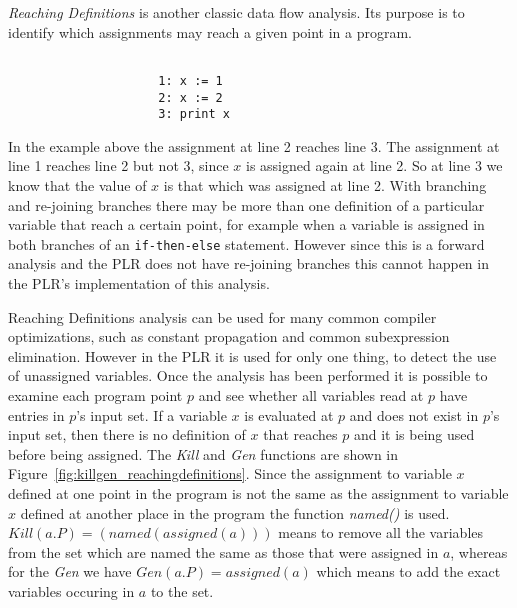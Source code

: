   \textit{Reaching Definitions} is another classic data flow analysis. Its 
  purpose is to identify which assignments may reach a given point in a 
  program.
  
\begin{Exa}
	\label{ex:reaching_definition}
	\begin{verbatim}
	
                     1: x := 1
                     2: x := 2
                     3: print x
	\end{verbatim}
\end{Exa}  
	
	In the example above the assignment at line 2 reaches line 3. The assignment 
	at line 1 reaches line 2 but not 3, since $x$ is assigned again at line 2. 
	So at line 3 we know that the value of $x$ is that which was assigned at 
	line 2. With branching and re-joining branches there may be more than one 
	definition of a particular variable that reach a certain point, for example 
	when a variable is assigned in both branches of an \texttt{if-then-else} 
	statement. However since this is a forward analysis and the PLR does not 
	have re-joining branches this cannot happen in the PLR's implementation of 
	this analysis. 
	
	Reaching Definitions analysis can be used for many common compiler 
	optimizations, such as constant propagation and common subexpression 
	elimination. However in the PLR it is used for only one thing, to detect the 
	use of unassigned variables. Once the analysis has been performed it is 
	possible to examine each program point $p$ and see whether all variables
	read at $p$ have entries in $p$'s input set. If a variable $x$ is evaluated
	at $p$ and does not exist in $p$'s input set, then there is no definition
	of $x$ that reaches $p$ and it is being used before being assigned. The 
	\textit{Kill} and \textit{Gen} functions are shown in 
	Figure~\ref{fig:killgen_reachingdefinitions}. Since the assignment to 
	variable $x$ defined at one point in the program is not the same as the 
	assignment to variable $x$ defined at another place in the program the 
	function \textit{named()} is used. ${Kill(a.P) = (named(assigned(a)))}$ 
	means to remove all the variables from the set which are named the same as 
	those that were assigned in $a$, whereas for the \textit{Gen} we have 
	$Gen(a.P) = assigned(a)$ which means to add the exact variables occuring in
	$a$ to the set. 
	
